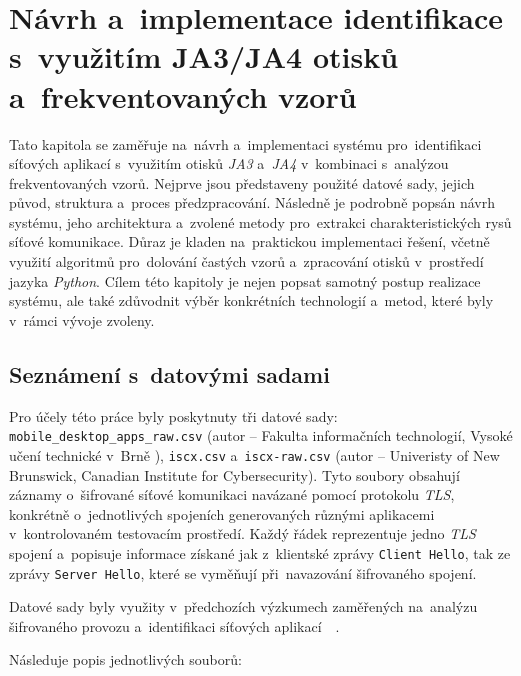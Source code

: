 \chapter{Návrh a~implementace identifikace s~využitím JA3/JA4 otisků a~frekventovaných vzorů}
\label{chp:design}
Tato kapitola se zaměřuje na~návrh a~implementaci systému pro~identifikaci síťových aplikací s~využitím otisků \textit{JA3} a~\textit{JA4} v~kombinaci s~analýzou frekventovaných vzorů. Nejprve jsou představeny použité datové sady, jejich původ, struktura a~proces předzpracování. Následně je podrobně popsán návrh systému, jeho architektura a~zvolené metody pro~extrakci charakteristických rysů síťové komunikace. Důraz je kladen na~praktickou implementaci řešení, včetně využití algoritmů pro~dolování častých vzorů a~zpracování otisků v~prostředí jazyka \textit{Python}. Cílem této kapitoly je nejen popsat samotný postup realizace systému, ale také zdůvodnit výběr konkrétních technologií a~metod, které byly v~rámci vývoje zvoleny.

\section{Seznámení s~datovými sadami}
\label{sec:dataset}
Pro účely této práce byly poskytnuty tři datové sady: \texttt{mobile\_desktop\_apps\_raw.csv} (autor -- Fakulta informačních technologií, Vysoké učení technické v~Brně ), \texttt{iscx.csv} a~\texttt{iscx-raw.csv} (autor -- Univeristy of New Brunswick, Canadian Institute for Cybersecurity). Tyto soubory obsahují záznamy o~šifrované síťové komunikaci navázané pomocí protokolu \textit{TLS}, konkrétně o~jednotlivých spojeních generovaných různými aplikacemi v~kontrolovaném testovacím prostředí. Každý řádek reprezentuje jedno \textit{TLS} spojení a~popisuje informace získané jak z~klientské zprávy \texttt{Client Hello}, tak ze zprávy \texttt{Server Hello}, které se vyměňují při~navazování šifrovaného spojení.

Datové sady byly využity v~předchozích výzkumech zaměřených na~analýzu šifrovaného provozu a~identifikaci síťových aplikací~\cite{MatousekMobileDevice2020}~\cite{BurgetovaJA42024}. 

Následuje popis jednotlivých souborů:


